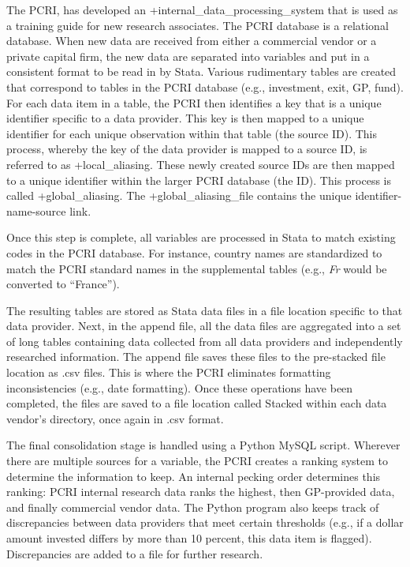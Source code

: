 \documentclass[
]{book}
\begin{document}
The PCRI, has developed an +internal\_data\_processing\_system\textbar{} that is used as a training guide for new research associates. The PCRI database is a relational database. When new data are received from either a commercial vendor or a private capital firm, the new data are separated into variables and put in a consistent format to be read in by Stata. Various rudimentary tabl­es are created that correspond to tables in the PCRI database (e.g., investment, exit, GP, fund). For each data item in a table, the PCRI then identifies a key that is a unique identifier specific to a data provider. This key is then mapped to a unique identifier for each unique observation within that table (the source ID). This process, whereby the key of the data provider is mapped to a source ID, is referred to as +local\_aliasing\textbar. These newly created source IDs are then mapped to a unique identifier within the larger PCRI database (the ID). This process is called +global\_aliasing\textbar. The +global\_aliasing\_file\textbar{} contains the unique identifier-name-source link.

Once this step is complete, all variables are processed in Stata to match existing codes in the PCRI database. For instance, country names are standardized to match the PCRI standard names in the supplemental tables (e.g., \emph{Fr} would be converted to ``France'').

The resulting tables are stored as Stata data files in a file location specific to that data provider. Next, in the append file, all the data files are aggregated into a set of long tables containing data collected from all data providers and independently researched information. The append file saves these files to the pre-stacked file location as .csv files. This is where the PCRI eliminates formatting inconsistencies (e.g., date formatting). Once these operations have been completed, the files are saved to a file location called Stacked within each data vendor's directory, once again in .csv format.

The final consolidation stage is handled using a Python MySQL script. Wherever there are multiple sources for a variable, the PCRI creates a ranking system to determine the information to keep. An internal pecking order determines this ranking: PCRI internal research data ranks the highest, then GP-provided data, and finally commercial vendor data. The Python program also keeps track of discrepancies between data providers that meet certain thresholds (e.g., if a dollar amount invested differs by more than 10 percent, this data item is flagged). Discrepancies are added to a file for further research.
\end{document}
